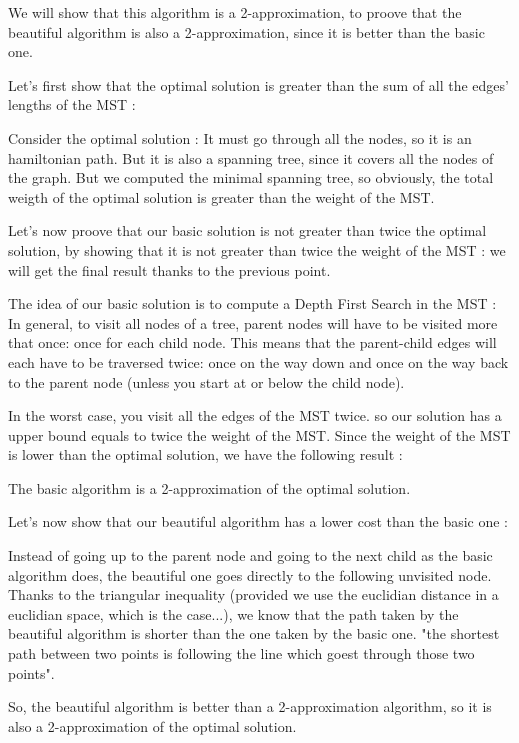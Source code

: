 \documentclass[11pt]{article}
\begin{document}
We will show that this algorithm is a 2-approximation, to proove that the beautiful algorithm is also a 2-approximation, since it is better than the basic one.

Let's first show that the optimal solution is greater than the sum of all the edges' lengths of the MST :

Consider the optimal solution : It must go through all the nodes, so it is an hamiltonian path. But it is also a spanning tree, since it covers all the nodes of the graph.
But we computed the minimal spanning tree, so obviously, the total weigth of the optimal solution is greater than the weight of the MST.

Let's now proove that our basic solution is not greater than twice the optimal solution, by showing that it is not greater than twice the weight of the MST : we will get the final result thanks to the previous point.

The idea of our basic solution is to compute a Depth First Search in the MST :
In general, to visit all nodes of a tree, parent nodes will have to be visited more that once: once for each child node. This means that the parent-child edges will each have to be traversed twice: once on the way down and once on the way back to the parent node (unless you start at or below the child node).

In the worst case, you visit all the edges of the MST twice. so  our solution has a upper bound equals to twice the weight of the MST.
Since the weight of the MST is lower than the optimal solution, we have the following result :

The basic algorithm is a 2-approximation of the optimal solution.


Let's now show that our beautiful algorithm has a lower cost than the basic one :

Instead of going up to the parent node and going to the next child as the basic algorithm does, the beautiful one goes directly to the following unvisited node.
Thanks to the triangular inequality (provided we use the euclidian distance in a euclidian space, which is the case...), we know that the path taken by the beautiful algorithm is shorter than the one taken by the basic one.
"the shortest path between two points is following the line which goest through those two points".

So, the beautiful algorithm is better than a 2-approximation algorithm, so it is also a 2-approximation of the optimal solution.
\end{document}
